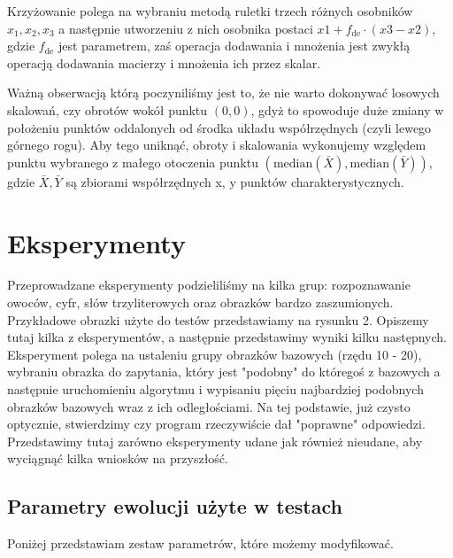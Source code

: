 \documentclass[a4paper,12pt,leqno]{article}
\newcommand{\median}{\mathrm{median}}
\begin{document}
Krzyżowanie polega na wybraniu metodą ruletki trzech różnych osobników $x_1, x_2, x_3$ a następnie utworzeniu z nich osobnika postaci
$x1 + f_\text{de}\cdot(x3-x2)$, gdzie $f_\text{de}$ jest parametrem, zaś operacja dodawania i mnożenia jest zwykłą operacją dodawania
macierzy i mnożenia ich przez skalar.

Ważną obserwacją którą poczyniliśmy jest to, że nie warto dokonywać losowych skalowań, czy obrotów wokół punktu $(0,0)$, gdyż to spowoduje duże
zmiany w położeniu punktów oddalonych od środka układu współrzędnych (czyli lewego górnego rogu). Aby tego uniknąć, obroty i skalowania wykonujemy
względem punktu wybranego z małego otoczenia punktu $(\median(\bar X), \median(\bar Y))$, gdzie $\bar X, \bar Y$ są zbiorami współrzędnych x, y
punktów charakterystycznych.

\section{Eksperymenty}
Przeprowadzane eksperymenty podzieliliśmy na kilka grup: rozpoznawanie owoców, cyfr, słów trzyliterowych oraz obrazków bardzo zaszumionych.
Przykładowe obrazki użyte do testów przedstawiamy na rysunku 2.
Opiszemy tutaj kilka z eksperymentów, a następnie przedstawimy wyniki kilku następnych.
Eksperyment polega na ustaleniu grupy obrazków bazowych (rzędu 10 - 20), wybraniu obrazka do zapytania, który jest "podobny" do któregoś z bazowych a następnie uruchomieniu algorytmu
i wypisaniu pięciu najbardziej podobnych obrazków bazowych wraz z ich odległościami. Na tej podstawie, już czysto optycznie, stwierdzimy czy program rzeczywiście dał "poprawne" odpowiedzi.
Przedstawimy tutaj zarówno eksperymenty udane jak również nieudane, aby wyciągnąć kilka wniosków na przyszłość.

\subsection{Parametry ewolucji użyte w testach}
Poniżej przedstawiam zestaw parametrów, które możemy modyfikować.
\end{document}
